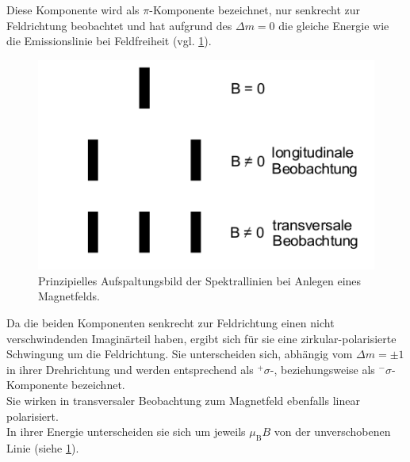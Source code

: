 Diese Komponente wird als $\pi$-Komponente bezeichnet, nur senkrecht zur Feldrichtung beobachtet und hat aufgrund des $\Delta m=0$ die gleiche Energie wie die Emissionslinie bei Feldfreiheit (vgl. \ref{fig:linien}).\\
\begin{figure}
  \centering
  \includegraphics[width=0.7\columnwidth]{pictures/linien.png}
  \caption{Prinzipielles Aufspaltungsbild der Spektrallinien bei Anlegen eines Magnetfelds.\cite{Anleitung}}
  \label{fig:linien}
\end{figure}
Da die beiden Komponenten senkrecht zur Feldrichtung einen nicht verschwindenden Imaginärteil haben, ergibt sich für sie eine zirkular-polarisierte Schwingung um die Feldrichtung. Sie unterscheiden sich, abhängig vom $\Delta m=\pm 1$ in ihrer Drehrichtung und werden entsprechend als $^{+}\sigma$-, beziehungsweise als $^{-}\sigma$-Komponente bezeichnet.\\
Sie wirken in transversaler Beobachtung zum Magnetfeld ebenfalls linear polarisiert.\\
In ihrer Energie unterscheiden sie sich um jeweils $\mu_{\mathrm{B}}B$ von der unverschobenen Linie (siehe \ref{fig:linien}).\\

